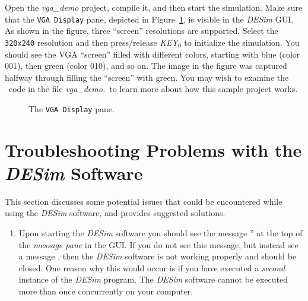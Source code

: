 {Open the {\it vga\_demo} project, compile it, and then start the simulation. Make sure
that the \texttt{VGA Display} pane, depicted in Figure~\ref{fig:vga_pane}, is visible in
the {\it DESim} GUI. As shown in the figure, three ``screen'' resolutions are supported. 
Select the \texttt{320x240} resolution and then press/release {\it KEY}$_0$ to initialize 
the simulation. You should see the VGA ``screen'' filled with different colors, starting
with blue (color 001), then green (color 010), and so on. The image in the figure was
captured halfway through filling the ``screen'' with green. You may wish to examine the 
\hdlName~code in the file {\it vga\_demo.\hdlFileExt}~to learn more about how this sample
project works.

\begin{figure}[h]
	\begin{center}
        \setlength{\fboxsep}{0pt}
	\end{center}
          \caption{The \texttt{VGA Display} pane.}
	\label{fig:vga_pane}
\end{figure}

\clearpage
\newpage
\section{Troubleshooting Problems with the {\it DESim} Software}
\label{sec:trouble}

This section discusses some potential issues that could be encountered while using the
{\it DESim} software, and provides suggested solutions.

\begin{enumerate}
\item Upon starting the {\it DESim} software you should see the message 
'' at the top of the {\it message pane} in the GUI. If you do 
not see this message, but instead see a message , then 
the {\it DESim} software is not working properly and should be closed. One
reason why this would occur is if you have executed a {\it second}
instance of the {\it DESim} program. The {\it DESim} software cannot be
executed more than once concurrently on your computer. 


\end{enumerate}}
